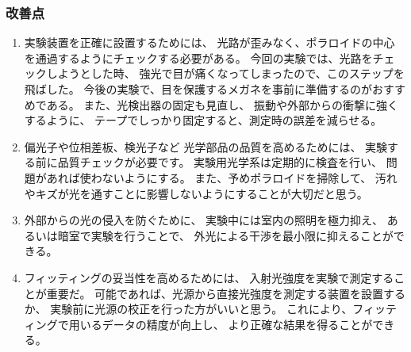 \documentclass{article}
\begin{document}
\subsubsection{改善点}
\begin{enumerate}[label=\alph*), before=\begin{spacing}{1.2}, after=\end{spacing}] %
    \item 実験装置を正確に設置するためには、
    光路が歪みなく、ポラロイドの中心を通過するようにチェックする必要がある。
    今回の実験では、光路をチェックしようとした時、
    強光で目が痛くなってしまったので、このステップを飛ばした。
    今後の実験で、目を保護するメガネを事前に準備するのがおすすめである。
    また、光検出器の固定も見直し、
    振動や外部からの衝撃に強くするように、
    テープでしっかり固定すると、測定時の誤差を減らせる。
    \item 偏光子や位相差板、検光子など
    光学部品の品質を高めるためには、
    実験する前に品質チェックが必要です。
    実験用光学系は定期的に検査を行い、
    問題があれば使わないようにする。
    また、予めポラロイドを掃除して、
    汚れやキズが光を通すことに影響しないようにすることが大切だと思う。
    \item 外部からの光の侵入を防ぐために、
    実験中には室内の照明を極力抑え、
    あるいは暗室で実験を行うことで、
    外光による干渉を最小限に抑えることができる。
    \item フィッティングの妥当性を高めるためには、
    入射光強度を実験で測定することが重要だ。
    可能であれば、光源から直接光強度を測定する装置を設置するか、
    実験前に光源の校正を行った方がいいと思う。
    これにより、フィッティングで用いるデータの精度が向上し、
    より正確な結果を得ることができる。
\end{enumerate}
\end{document}
